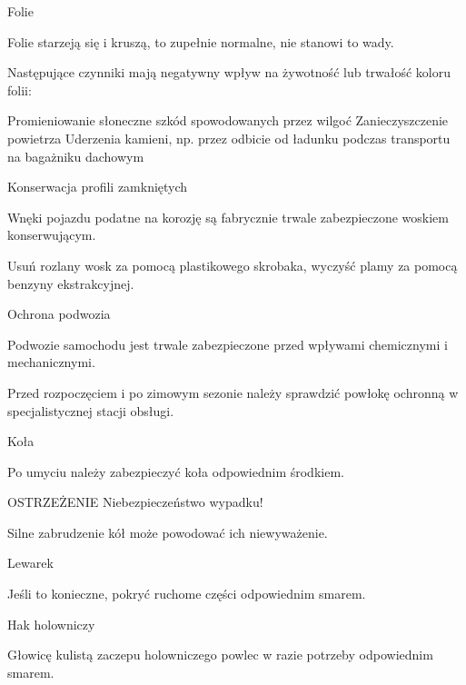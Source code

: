 Folie

Folie starzeją się i kruszą, to zupełnie normalne, nie stanowi to wady.

Następujące czynniki mają negatywny wpływ na żywotność lub trwałość koloru folii:
\begin{itemizeTriangle}
	\itemTriangle Promieniowanie słoneczne
	\itemTriangle szkód spowodowanych przez wilgoć
	\itemTriangle Zanieczyszczenie powietrza
	\itemTriangle Uderzenia kamieni, np. przez odbicie od ładunku podczas transportu na bagażniku dachowym
\end{itemizeTriangle}

Konserwacja profili zamkniętych

Wnęki pojazdu podatne na korozję są fabrycznie trwale zabezpieczone woskiem konserwującym.

\begin{itemizeArrow}
	\itemArrow Usuń rozlany wosk za pomocą plastikowego skrobaka, wyczyść plamy za pomocą benzyny ekstrakcyjnej.
\end{itemizeArrow}

Ochrona podwozia

Podwozie samochodu jest trwale zabezpieczone przed wpływami chemicznymi i mechanicznymi.

\begin{itemizeArrow}
	\itemArrow Przed rozpoczęciem i po zimowym sezonie należy sprawdzić powłokę ochronną w specjalistycznej stacji obsługi.
\end{itemizeArrow}

Koła
\begin{itemizeArrow}
	\itemArrow Po umyciu należy zabezpieczyć koła odpowiednim środkiem.
\end{itemizeArrow}

OSTRZEŻENIE
Niebezpieczeństwo wypadku!
\begin{itemizeTriangle}
	\itemTriangle Silne zabrudzenie kół może powodować ich niewyważenie.
\end{itemizeTriangle}

Lewarek
\begin{itemizeArrow}
	\itemArrow Jeśli to konieczne, pokryć ruchome części odpowiednim smarem.
\end{itemizeArrow}

Hak holowniczy
\begin{itemizeArrow}
	\itemArrow Głowicę kulistą zaczepu holowniczego powlec w razie potrzeby odpowiednim smarem.
\end{itemizeArrow}

